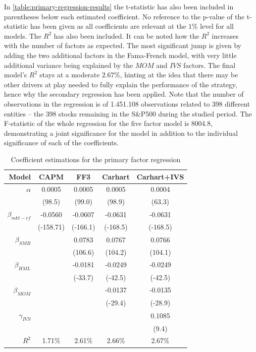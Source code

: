 In \autoref{table:primary-regression-results} the t-statistic has also been included in parentheses below each estimated coefficient. No reference to the p-value of the t-statistic has been given as all coefficients are relevant at the $1\%$ level for all models. The $R^2$ has also been included. It can be noted how the $R^2$ increases with the number of factors as expected. The most significant jump is given by adding the two additional factors in the Fama-French model, with very little additional variance being explained by the $MOM$ and $IVS$ factors. The final model's $R^2$ stays at a moderate $2.67\%$, hinting at the idea that there may be other drivers at play needed to fully explain the performance of the strategy, hence why the secondary regression has been applied. Note that the number of observations in the regression is of 1.451.108 observations related to 398 different entities -- the 398 stocks remaining in the S\&P500 during the studied period. The F-statistic of the whole regression for the five factor model is 8004.8, demonstrating a joint significance for the model in addition to the individual significance of each of the coefficients. 

\begin{table}[ht]
    \centering
    \begin{tabular}{rcccc}
        \toprule
        Model & CAPM & FF3 & Carhart & Carhart+IVS \\ 
        \midrule
        $\alpha$ & 0.0005 & 0.0005 & 0.0005 & 0.0004 \\
                 & (98.5) & (99.0) & (98.9) & (63.3) \\[8px]
        $\beta_{mkt-rf}$ & -0.0560 & -0.0607 & -0.0631 & -0.0631 \\
                         & (-158.71) & (-166.1) & (-168.5) & (-168.5) \\[8px]
        $\beta_{SMB}$ & & 0.0783 & 0.0767 & 0.0766 \\
                      & & (106.6) & (104.2) & (104.1) \\[8px]
        $\beta_{HML}$ & & -0.0181 & -0.0249 & -0.0249 \\
                      & & (-33.7) & (-42.5) & (-42.5) \\[8px]
        $\beta_{MOM}$ & & & -0.0137 & -0.0135 \\
                      & & & (-29.4) & (-28.9) \\[8px]
        $\gamma_{IVS}$ & & & & 0.1085 \\
                       & & & & (9.4) \\[8px]
        \midrule
        $R^2$ & 1.71\% & 2.61\% & 2.66\% & 2.67\% \\

        \bottomrule
    \end{tabular}
    \caption{Coefficient estimations for the primary factor regression}
    \label{table:primary-regression-results}
\end{table}

